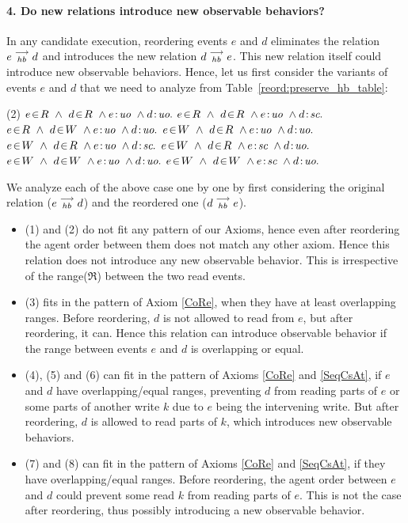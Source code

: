 
\paragraph{4. Do new relations introduce new observable behaviors?}
    In any candidate execution, reordering events $e$ and $d$ eliminates the relation $e\stackrel{\longrightarrow}{_{hb}}d$ and introduces the new relation $d\stackrel{\longrightarrow}{_{hb}}e$.
    This new relation itself could introduce new observable behaviors.  
    Hence, let us first consider the variants of events $e$ and $d$ that we need to analyze from Table~\ref{reord:preserve_hb_table}:
    \begin{tasks}[style=enumerate](2)
        \task $\event{e}{R} \ \wedge \ \event{d}{R} \ \wedge \et{e}{uo} \ \wedge \et{d}{uo}.$
        \task $\event{e}{R} \ \wedge \ \event{d}{R} \ \wedge \et{e}{uo} \ \wedge \et{d}{sc}.$
        \task $\event{e}{R} \ \wedge \ \event{d}{W} \ \wedge \et{e}{uo} \ \wedge \et{d}{uo}.$
        \task $\event{e}{W} \ \wedge \ \event{d}{R} \ \wedge \et{e}{uo} \ \wedge \et{d}{uo}.$
        \task $\event{e}{W} \ \wedge \ \event{d}{R} \ \wedge \et{e}{uo} \ \wedge \et{d}{sc}.$
        \task $\event{e}{W} \ \wedge \ \event{d}{R} \ \wedge \et{e}{sc} \ \wedge \et{d}{uo}.$
        \task $\event{e}{W} \ \wedge \ \event{d}{W} \ \wedge \et{e}{uo} \ \wedge \et{d}{uo}.$
        \task $\event{e}{W} \ \wedge \ \event{d}{W} \ \wedge \et{e}{sc} \ \wedge \et{d}{uo}.$
    \end{tasks}

    We analyze each of the above case one by one by first considering the original relation ($e\stackrel{\longrightarrow}{_{hb}}d$) and the reordered one ($d\stackrel{\longrightarrow}{_{hb}}e$). 
    \begin{itemize}
        \item (1) and (2) do not fit any pattern of our Axioms, hence even after reordering the agent order between them does not match any other axiom. Hence this relation does not introduce any new observable behavior. This is irrespective of the range($\Re$) between the two read events.
        \item (3) fits in the pattern of Axiom \ref{CoRe}, when they have at least overlapping ranges. Before reordering, $d$ is not allowed to read from $e$, but after reordering, it can. Hence this relation can introduce observable behavior if the range between events $e$ and $d$ is overlapping or equal. 
        \item (4), (5) and (6) can fit in the pattern of Axioms \ref{CoRe} and \ref{SeqCsAt}, if $e$ and $d$ have overlapping/equal ranges, preventing $d$ from reading parts of $e$ or some parts of another write $k$ due to $e$ being the intervening write. But after reordering, $d$ is allowed to read parts of $k$, which introduces new observable behaviors.
        \item (7) and (8) can fit in the pattern of Axioms \ref{CoRe} and \ref{SeqCsAt}, if they have overlapping/equal ranges. Before reordering, the agent order between $e$ and $d$ could prevent some read $k$ from reading parts of $e$. This is not the case after reordering, thus possibly introducing a new observable behavior. 
    \end{itemize}

